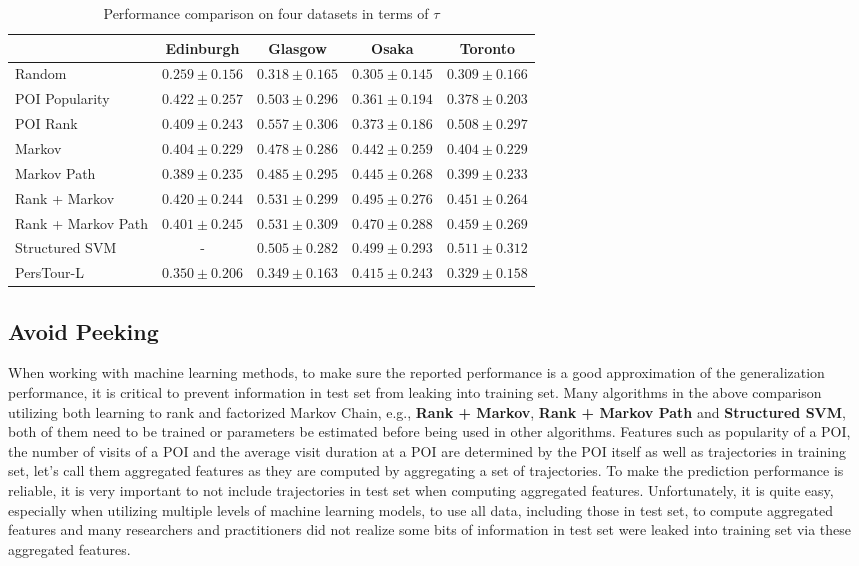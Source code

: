 \begin{table*}
\centering
\begin{tabular}{l|cccc} \hline
 & Edinburgh & Glasgow & Osaka & Toronto \\ \hline
Random & $0.259\pm0.156$ & $0.318\pm0.165$ & $0.305\pm0.145$ & $0.309\pm0.166$ \\
POI Popularity & $\mathbf{0.422\pm0.257}$ & $0.503\pm0.296$ & $0.361\pm0.194$ & $0.378\pm0.203$ \\
POI Rank & $0.409\pm0.243$ & $\mathbf{0.557\pm0.306}$ & $0.373\pm0.186$ & $0.508\pm0.297$ \\
Markov & $0.404\pm0.229$ & $0.478\pm0.286$ & $0.442\pm0.259$ & $0.404\pm0.229$ \\
Markov Path & $0.389\pm0.235$ & $0.485\pm0.295$ & $0.445\pm0.268$ & $0.399\pm0.233$ \\
Rank + Markov & $0.420\pm0.244$ & $0.531\pm0.299$ & $0.495\pm0.276$ & $0.451\pm0.264$ \\
Rank + Markov Path & $0.401\pm0.245$ & $0.531\pm0.309$ & $0.470\pm0.288$ & $0.459\pm0.269$ \\
Structured SVM & - & $0.505\pm0.282$ & $\mathbf{0.499\pm0.293}$ & $\mathbf{0.511\pm0.312}$ \\
PersTour-L & $0.350\pm0.206$ & $0.349\pm0.163$ & $0.415\pm0.243$ & $0.329\pm0.158$ \\
\hline
\end{tabular}
\caption{Performance comparison on four datasets in terms of $\tau$}
\label{table:tau}
\end{table*}


\subsection{Avoid Peeking}
When working with machine learning methods, to make sure the reported performance is a good approximation
of the generalization performance, it is critical to prevent information in test set from leaking into
training set.
Many algorithms in the above comparison utilizing both learning to rank and factorized Markov Chain, 
e.g., \textbf{Rank + Markov}, \textbf{Rank + Markov Path} and \textbf{Structured SVM},
both of them need to be trained or parameters be estimated before being used in other algorithms.
Features such as popularity of a POI, the number of visits of a POI and the average visit duration at a POI are
determined by the POI itself as well as trajectories in training set, let's call them aggregated features as they are 
computed by aggregating a set of trajectories.
To make the prediction performance is reliable, it is very important to not include trajectories in test set 
when computing aggregated features.
Unfortunately, it is quite easy, especially when utilizing multiple levels of machine learning models,
to use all data, including those in test set, to compute aggregated features and many researchers and 
practitioners did not realize some bits of information in test set were leaked into training set via these aggregated features.

